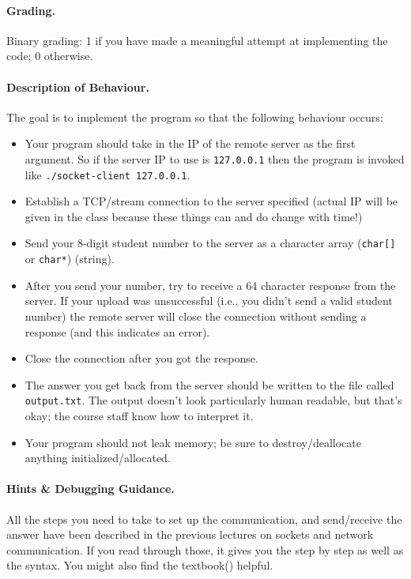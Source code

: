 \paragraph{Grading.} Binary grading: 1 if you have made a meaningful attempt at implementing the code; 0 otherwise.

\paragraph{Description of Behaviour.} The goal is to implement the program so that the following behaviour occurs:

\begin{itemize}
	\item Your program should take in the IP of the remote server as the first argument. So if the server IP to use is \texttt{127.0.0.1} then the program is invoked like \texttt{./socket-client 127.0.0.1}. 
	\item Establish a TCP/stream connection to the server specified (actual IP will be given in the class because these things can and do change with time!) 
	\item Send your 8-digit student number to the server as a character array (\texttt{char[]} or \texttt{char*}) (string).
	\item After you send your number, try to receive a 64 character response from the server. If your upload was unsuccessful (i.e., you didn't send a valid student number) the remote server will close the connection without sending a response (and this indicates an error).
	\item Close the connection after you got the response.
	\item The answer you get back from the server should be written to the file called \texttt{output.txt}. The output doesn't look particularly human readable, but that's okay; the course staff know how to interpret it.
	\item Your program should not leak memory; be sure to destroy/deallocate anything initialized/allocated.
\end{itemize}


\paragraph{Hints \& Debugging Guidance.}
All the steps you need to take to set up the communication, and send/receive the answer have been described in the previous lectures on sockets and network communication. If you read through those, it gives you the step by step as well as the syntax. You might also find the textbook(\cite{apunix}) helpful.

